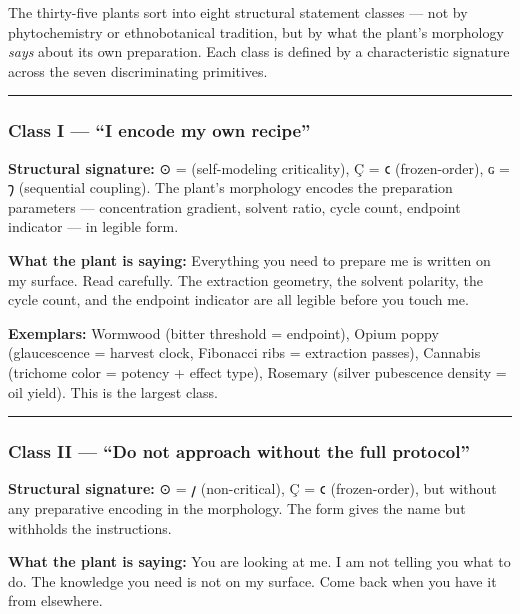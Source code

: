 \documentclass[12pt,a4paper]{article}
\begin{document}
The thirty-five plants sort into eight structural statement classes ---
not by phytochemistry or ethnobotanical tradition, but by what the
plant's morphology \emph{says} about its own preparation. Each class is
defined by a characteristic signature across the seven discriminating
primitives.

\begin{center}\rule{0.5\linewidth}{0.5pt}\end{center}

\hypertarget{class-i-i-encode-my-own-recipe}{%
\subsubsection{Class I --- ``I encode my own
recipe''}\label{class-i-i-encode-my-own-recipe}}

\textbf{Structural signature:} ⊙ = \odot (self-modeling criticality), Ç
= 𐑤 (frozen-order), ɢ = 𐑠 (sequential coupling). The plant's morphology
encodes the preparation parameters --- concentration gradient, solvent
ratio, cycle count, endpoint indicator --- in legible form.

\textbf{What the plant is saying:} Everything you need to prepare me is
written on my surface. Read carefully. The extraction geometry, the
solvent polarity, the cycle count, and the endpoint indicator are all
legible before you touch me.

\textbf{Exemplars:} Wormwood (bitter threshold = endpoint), Opium poppy
(glaucescence = harvest clock, Fibonacci ribs = extraction passes),
Cannabis (trichome color = potency + effect type), Rosemary (silver
pubescence density = oil yield). This is the largest class.

\begin{center}\rule{0.5\linewidth}{0.5pt}\end{center}

\hypertarget{class-ii-do-not-approach-without-the-full-protocol}{%
\subsubsection{Class II --- ``Do not approach without the full
protocol''}\label{class-ii-do-not-approach-without-the-full-protocol}}

\textbf{Structural signature:} ⊙ = 𐑢 (non-critical), Ç = 𐑤
(frozen-order), but without any preparative encoding in the morphology.
The form gives the name but withholds the instructions.

\textbf{What the plant is saying:} You are looking at me. I am not
telling you what to do. The knowledge you need is not on my surface.
Come back when you have it from elsewhere.
\end{document}
